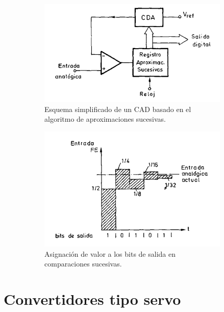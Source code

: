 \begin{figure}[H]
     \centering
     \begin{subfigure}[b]{0.45\textwidth}
         \centering
         \includegraphics[width=\textwidth]{Imagenes/Convertidor de aproximaciones sucesivas.png}
         \caption{Esquema simplificado de un CAD basado en el algoritmo de aproximaciones sucesivas.}
     \end{subfigure}
     \hfill
     \begin{subfigure}[b]{0.45\textwidth}
         \centering
         \includegraphics[width=\textwidth]{Imagenes/Convertidor Aproximaciones Sucesivas Bits.png}
         \caption{Asignación de valor a los bits de salida en comparaciones sucesivas.}
     \end{subfigure}
    \caption{}
\end{figure}

\section{Convertidores tipo servo}

